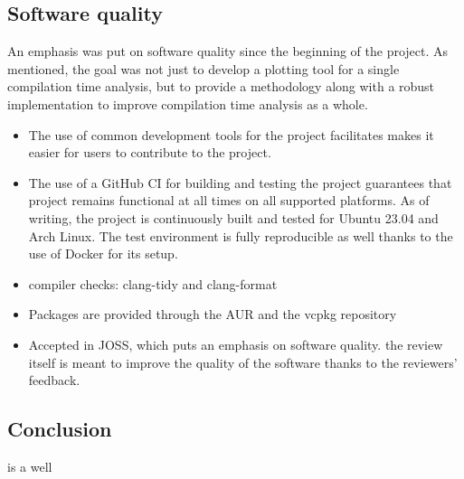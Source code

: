 \documentclass[../main]{subfiles}
\begin{document}
\subsection{
  Software quality
}

An emphasis was put on software quality since the beginning of the project.
As mentioned, the goal was not just to develop a plotting tool for a single
compilation time analysis, but to provide a methodology along with a robust
implementation to improve compilation time analysis as a whole.

\begin{itemize}

\item
The use of common \cpp development tools for the project facilitates
makes it easier for users to contribute to the project.

\item
The use of a GitHub CI for building and testing the project guarantees that
project remains functional at all times on all supported platforms.
As of writing, the project is continuously built and tested for Ubuntu 23.04
and Arch Linux. The test environment is fully reproducible as well thanks to
the use of Docker for its setup.

\item
compiler checks: clang-tidy and clang-format

\item
Packages are provided through the AUR and the vcpkg repository

\item
Accepted in JOSS, which puts an emphasis on software quality.
the review itself is meant to improve the quality of the software
thanks to the reviewers' feedback.
\end{itemize}

\subsection{
  Conclusion
}

\ctbench is a well
\end{document}
